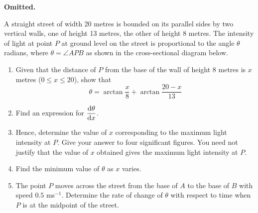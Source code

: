 \documentclass{echw}
\begin{document}
    \problem{}
        \textbf{Omitted.}

    \problem{}
        A straight street of width 20 metres is bounded on its parallel sides by two vertical walls, one of height 13 metres, the other of height 8 metres. The intensity of light at point $P$ at ground level on the street is proportional to the angle $\theta$ radians, where $\theta = \angle APB$ as shown in the cross-sectional diagram below.

        \begin{center}
        \end{center}

        \begin{enumerate}
            \item Given that the distance of $P$ from the base of the wall of height 8 metres is $x$ metres ($0 \leq x \leq 20$), show that
            \begin{equation*}
                \theta = \arctan \dfrac{x}8 + \arctan \dfrac{20-x}{13}
            \end{equation*}
            \item Find an expression for $\dfrac{\mathrm{d} \theta}{\mathrm{d} x}$.
            \item Hence, determine the value of $x$ corresponding to the maximum light intensity at $P$. Give your answer to four significant figures. You need not justify that the value of $x$ obtained gives the maximum light intensity at $P$.
            \item Find the minimum value of $\theta$ as $x$ varies.
            \item The point $P$ moves across the street from the base of $A$ to the base of $B$ with speed $0.5$ ms$^{-1}$. Determine the rate of change of $\theta$ with respect to time when $P$ is at the midpoint of the street.
        \end{enumerate}
\end{document}
